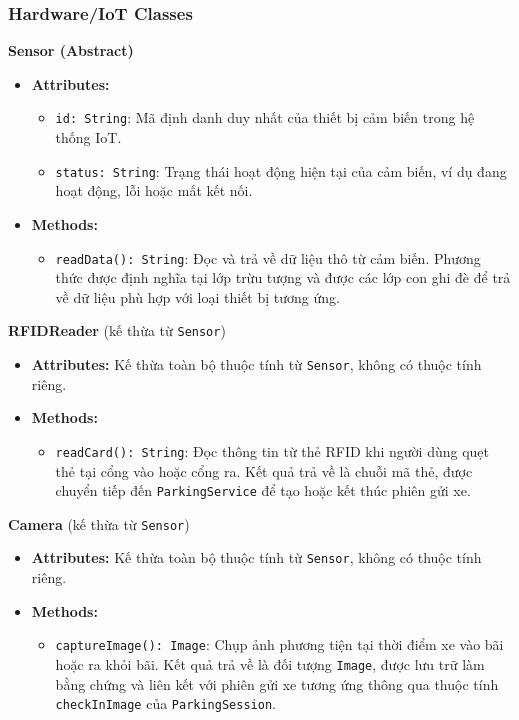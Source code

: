 \subsubsection{Hardware/IoT Classes}

\noindent\textbf{Sensor (Abstract)}
\begin{itemize}
	\item \textbf{Attributes:}
	\begin{itemize}
		\item \texttt{id: String}: Mã định danh duy nhất của thiết bị cảm biến trong hệ thống IoT.
		\item \texttt{status: String}: Trạng thái hoạt động hiện tại của cảm biến, ví dụ đang hoạt động, lỗi hoặc mất kết nối.
	\end{itemize}
	\item \textbf{Methods:}
	\begin{itemize}
		\item \texttt{readData(): String}: Đọc và trả về dữ liệu thô từ cảm biến. Phương thức được định nghĩa tại lớp trừu tượng và được các lớp con ghi đè để trả về dữ liệu phù hợp với loại thiết bị tương ứng.
	\end{itemize}
\end{itemize}

\noindent\textbf{RFIDReader} (kế thừa từ \texttt{Sensor})
\begin{itemize}
	\item \textbf{Attributes:} Kế thừa toàn bộ thuộc tính từ \texttt{Sensor}, không có thuộc tính riêng.
	\item \textbf{Methods:}
	\begin{itemize}
		\item \texttt{readCard(): String}: Đọc thông tin từ thẻ RFID khi người dùng quẹt thẻ tại cổng vào hoặc cổng ra. Kết quả trả về là chuỗi mã thẻ, được chuyển tiếp đến \texttt{ParkingService} để tạo hoặc kết thúc phiên gửi xe.
	\end{itemize}
\end{itemize}

\noindent\textbf{Camera} (kế thừa từ \texttt{Sensor})
\begin{itemize}
	\item \textbf{Attributes:} Kế thừa toàn bộ thuộc tính từ \texttt{Sensor}, không có thuộc tính riêng.
	\item \textbf{Methods:}
	\begin{itemize}
		\item \texttt{captureImage(): Image}: Chụp ảnh phương tiện tại thời điểm xe vào bãi hoặc ra khỏi bãi. Kết quả trả về là đối tượng \texttt{Image}, được lưu trữ làm bằng chứng và liên kết với phiên gửi xe tương ứng thông qua thuộc tính \texttt{checkInImage} của \texttt{ParkingSession}.
	\end{itemize}
\end{itemize}

